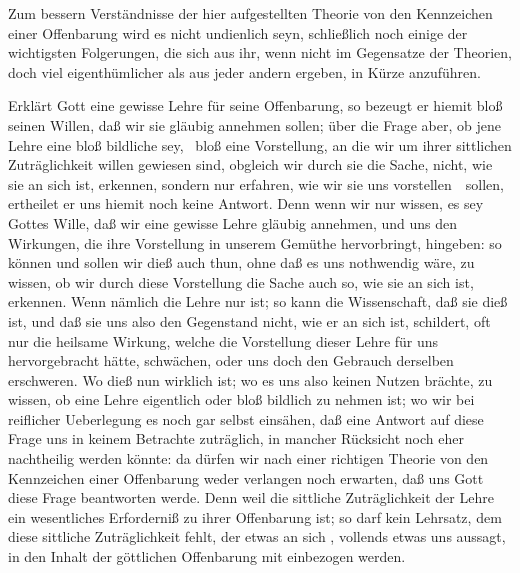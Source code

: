 Zum bessern Verständnisse der hier aufgestellten Theorie von den Kennzeichen einer Offenbarung wird es nicht undienlich seyn, schließlich noch einige der wichtigsten Folgerungen, die sich aus ihr, wenn nicht im Gegensatze der  Theorien, doch viel eigenthümlicher als aus jeder andern ergeben, in Kürze anzuführen.
\begin{aufza}
\item Erklärt Gott eine gewisse Lehre für seine Offenbarung, so bezeugt er hiemit bloß seinen Willen, daß wir sie gläubig annehmen sollen; über die Frage aber, ob jene Lehre eine bloß bildliche sey, \dh\ bloß eine Vorstellung, an die wir um ihrer sittlichen Zuträglichkeit willen gewiesen sind, obgleich wir durch sie die Sache, nicht, wie sie an sich ist, erkennen, sondern nur erfahren, wie wir sie uns vorstellen~\ sollen, ertheilet er uns hiemit noch keine Antwort. Denn wenn wir nur wissen, es sey Gottes Wille, daß wir eine gewisse Lehre gläubig annehmen, und uns den Wirkungen, die ihre Vorstellung in unserem Gemüthe hervorbringt, hingeben: so können und sollen wir dieß auch thun, ohne daß es uns nothwendig wäre, zu wissen, ob wir durch diese Vorstellung die Sache auch so, wie sie an sich ist, erkennen. Wenn nämlich die Lehre nur  ist; so kann die Wissenschaft, daß sie dieß ist, und daß sie uns also den Gegenstand nicht, wie er an sich ist, schildert, oft nur die heilsame Wirkung, welche die Vorstellung dieser Lehre für uns hervorgebracht hätte, schwächen, oder uns doch den Gebrauch derselben erschweren. Wo dieß nun wirklich ist; wo es uns also keinen Nutzen brächte, zu wissen, ob eine Lehre eigentlich oder bloß bildlich zu nehmen ist; wo wir bei reiflicher Ueberlegung es noch gar selbst einsähen, daß eine Antwort auf diese Frage uns in keinem Betrachte zuträglich, in mancher Rücksicht noch eher nachtheilig werden könnte: da dürfen wir nach einer richtigen Theorie von den Kennzeichen einer Offenbarung weder verlangen noch erwarten, daß uns Gott diese Frage beantworten werde. Denn weil die sittliche Zuträglichkeit der Lehre ein wesentliches Erforderniß zu ihrer Offenbarung ist; so darf kein Lehrsatz, dem diese sittliche Zuträglichkeit fehlt, der etwas an sich , vollends etwas uns  aussagt, in den Inhalt der göttlichen Offenbarung mit einbezogen werden.

\end{aufza}
